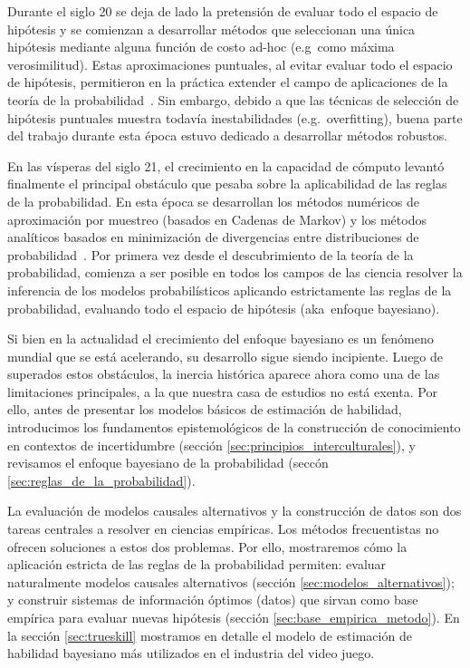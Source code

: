 \documentclass[a4paper,11pt]{book}
\theoremstyle{definition}
\begin{document}

Durante el siglo 20 se deja de lado la pretensión de evaluar todo el espacio de hipótesis y se comienzan a desarrollar métodos que seleccionan una única hipótesis mediante alguna función de costo ad-hoc (e.g~como máxima verosimilitud).
%
Estas aproximaciones puntuales, al evitar evaluar todo el espacio de hipótesis, permitieron en la práctica extender el campo de aplicaciones de la teoría de la probabilidad~\cite{friedman2001-elementsOfStatisticalLearning}.
%
Sin embargo, debido a que las técnicas de selección de hipótesis puntuales muestra todavía inestabilidades (e.g.~overfitting), buena parte del trabajo durante esta época estuvo dedicado a desarrollar métodos robustos.


En las vísperas del siglo 21, el crecimiento en la capacidad de cómputo levantó finalmente el principal obstáculo que pesaba sobre la aplicabilidad de las reglas de la probabilidad.
%
En esta época se desarrollan los métodos numéricos de aproximación por muestreo (basados en Cadenas de Markov) y los métodos analíticos basados en minimización de divergencias entre distribuciones de probabilidad~\cite{bishop2006-PRML}.
%
Por primera vez desde el descubrimiento de la teoría de la probabilidad, comienza a ser posible en todos los campos de las ciencia resolver la inferencia de los modelos probabilísticos aplicando estrictamente las reglas de la probabilidad, evaluando todo el espacio de hipótesis (aka~enfoque bayesiano).


Si bien en la actualidad el crecimiento del enfoque bayesiano es un fenómeno mundial que se está acelerando, su desarrollo sigue siendo incipiente.
%
Luego de superados estos obstáculos, la inercia histórica aparece ahora como una de las limitaciones principales, a la que nuestra casa de estudios no está exenta.
%
Por ello, antes de presentar los modelos básicos de estimación de habilidad, introducimos los fundamentos epistemológicos de la construcción de conocimiento en contextos de incertidumbre (sección \ref{sec:principios_interculturales}), y revisamos el enfoque bayesiano de la probabilidad (seccón \ref{sec:reglas_de_la_probabilidad}).


La evaluación de modelos causales alternativos y la construcción de datos son dos tareas centrales a resolver en ciencias empíricas.
%
Los métodos frecuentistas no ofrecen soluciones a estos dos problemas.
%
Por ello, mostraremos cómo la aplicación estricta de las reglas de la probabilidad permiten: evaluar naturalmente modelos causales alternativos (sección \ref{sec:modelos_alternativos}); y construir sistemas de información óptimos (datos) que sirvan como base empírica para evaluar nuevas hipótesis (sección \ref{sec:base_empirica_metodo}).
En la sección \ref{sec:trueskill} mostramos en detalle el modelo de estimación de habilidad bayesiano más utilizados en el industria del video juego.
%
\end{document}

